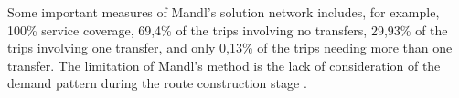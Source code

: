 
Some important measures of Mandl's solution network includes, for example, 100\% service coverage, 69,4\% of the trips involving no transfers, 29,93\% of the trips involving one transfer, and only 0,13\% of the trips needing more than one transfer. The limitation of Mandl's method is the lack of consideration of the demand pattern during the route construction stage \citep{zhao03}.






